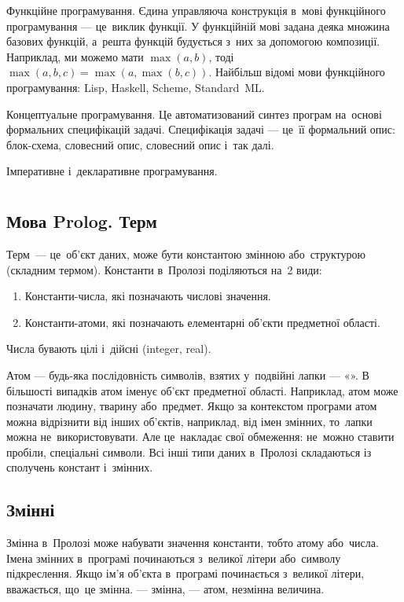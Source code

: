 \documentclass[
	a4paper,
	oneside,
	BCOR = 10mm,
	DIV = 12,
	12pt,
	headings = normal,
]{scrartcl}
\begin{document}
		Функційне програмування. Єдина управляюча конструкція в~мові функційного програмування — це~виклик функції. У функційній мові задана деяка множина базових функцій, а~решта функцій будується з~них за допомогою композиції. Наприклад, ми можемо мати $\max (a, b)$, тоді $\max (a, b, c) = \max (a, \max(b, c) )$. Найбільш відомі мови функційного програмування: \textenglish{Lisp}, \textenglish{Haskell}, \textenglish{Scheme}, \textenglish{Standard~ML}. 

		Концептуальне програмування. Це автоматизований синтез програм на~основі формальних специфікацій задачі. Специфікація задачі — це~її формальний опис: блок-схема, словесний опис, словесний опис і~так далі. 

		Імперативне і~декларативне програмування. 

	\section{}
		\subsection{Мова Prolog. Терм}
			Терм~— це~об'єкт даних, може бути константою змінною або~структурою (складним термом). Константи в~Пролозі поділяються на~2 види:
			\begin{enumerate}
				\item Константи-числа, які позначають числові значення. 
				\item Константи-атоми, які позначають елементарні об'єкти предметної області. 
			\end{enumerate}

			Числа бувають цілі і~дійсні (\textenglish{integer}, \textenglish{real}). 

			Атом — будь-яка послідовність символів, взятих у~подвійні лапки — «». В більшості випадків атом іменує об'єкт предметної області. Наприклад, атом може позначати людину, тварину або~предмет. Якщо за контекстом програми атом можна відрізнити від інших об'єктів, наприклад, від імен змінних, то~лапки можна не~використовувати. Але це~накладає свої обмеження: не~можно ставити пробіли, спеціальні символи. Всі інші типи даних в~Пролозі складаються із сполучень констант і~змінних. 

		\subsection{Змінні}
			Змінна в~Пролозі може набувати значення константи, тобто атому або~числа. Імена змінних в~програмі починаються з~великої літери або~символу підкреслення. Якщо ім'я об'єкта в~програмі починається з~великої літери, вважається, що~це змінна.  — змінна,  — атом, незмінна величина. 
\end{document}
